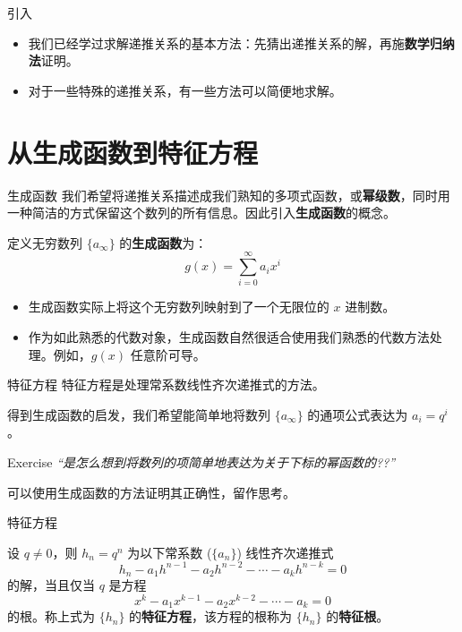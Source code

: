 \documentclass{beamer}
\begin{document}
\begin{frame}{引入}
    \begin{itemize}
        \item 我们已经学过求解递推关系的基本方法：先猜出递推关系的解，再施\textbf{数学归纳法}证明。
        \pause
        \item 对于一些特殊的递推关系，有一些方法可以简便地求解。
    \end{itemize}
\end{frame}

\section{从生成函数到特征方程}

\begin{frame}{生成函数}
    我们希望将递推关系描述成我们熟知的多项式函数，或\textbf{幂级数}，同时用一种简洁的方式保留这个数列的所有信息。因此引入\textbf{生成函数}的概念。
    \begin{definition}
        定义无穷数列 $\{a_\infty\}$ 的\textbf{生成函数}为：
        $$
            g(x) = \sum_{i=0}^\infty a_ix^i
        $$
    \end{definition}
    \pause
    \begin{itemize}
        \item 生成函数实际上将这个无穷数列映射到了一个无限位的 $x$ 进制数。
        \pause
        \item 作为如此熟悉的代数对象，生成函数自然很适合使用我们熟悉的代数方法处理。例如，$g(x)$ 任意阶可导。
    \end{itemize}
\end{frame}

\begin{frame}{特征方程}
    特征方程是处理常系数线性齐次递推式的方法。

    得到生成函数的启发，我们希望能简单地将数列 $\{a_\infty\}$ 的通项公式表达为 $a_i = q^i$。
    \pause
    \begin{block}{Exercise}
        \textit{``是怎么想到将数列的项简单地表达为关于下标的幂函数的??''}

        可以使用生成函数的方法证明其正确性，留作思考。
    \end{block}
\end{frame}

\begin{frame}{特征方程}
    \begin{theorem}[特征方程与特征根]
        设 $q \ne 0$，则 $h_n = q^n$ 为以下常系数 ($\{a_n\}$) 线性齐次递推式
        $$
            h_n - a_1h^{n-1} - a_2h^{n-2} - \cdots - a_kh^{n-k} = 0 
        $$
        的解，当且仅当 $q$ 是方程
        $$
            x^k - a_1x^{k-1}-a_2x^{k-2}-\cdots-a_k = 0
        $$
        的根。称上式为 $\{h_n\}$ 的\textbf{特征方程}，该方程的根称为 $\{h_n\}$ 的\textbf{特征根}。
    \end{theorem}
\end{frame}
\end{document}
